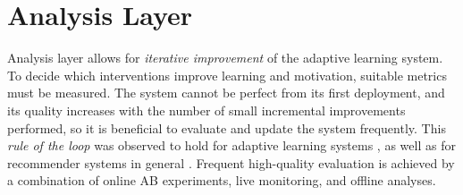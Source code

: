 
\section{Analysis Layer}
\label{sec:metrics-and-evaluation}



Analysis layer allows for \emph{iterative improvement} of the adaptive learning system.
To decide which interventions improve learning and motivation, %
  suitable metrics must be measured. %
The system cannot be perfect from its first deployment,
and its quality increases with the number of small
incremental improvements performed, so it is beneficial to
evaluate and update the system frequently.
This \emph{rule of the loop} \cite{book-of-lenses}
was observed to hold for adaptive learning systems \cite[p.124]{its-domain-models, stupid-tutoring-systems-intelligent-humans}, %
as well as for recommender systems in general \cite[][Rule 16]{google-ml-rules}.
Frequent high-quality evaluation is achieved by a combination of
  online AB experiments, live monitoring, and offline analyses.


